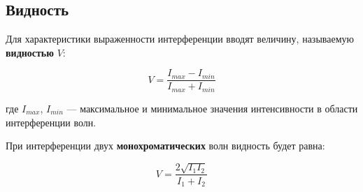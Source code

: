 \subsection{Видность}

Для характеристики выраженности интерференции вводят величину, называемую \textbf{видностью} $V$:

\begin{equation}
	V = \frac{I_{max} - I_{min}}{I_{max} + I_{min}}
	\label{eq:Vidnost}
\end{equation}

где $I_{max}$, $I_{min}$ --- максимальное и минимальное значения интенсивности в области интерференции волн.

При интерференции двух \textbf{монохроматических} волн видность будет равна:

\begin{equation*}
	V = \frac{2 \sqrt{I_1 I_2}}{I_1 + I_2}
\end{equation*}
